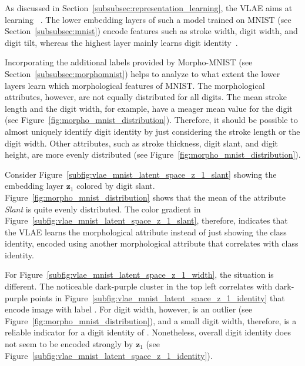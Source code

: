 As discussed in Section~\ref{subsubsec:representation_learning}, the \acl{VLAE} aims at learning ~\citep{zhao2017learning}.
The lower embedding layers of such a model trained on MNIST (see Section~\ref{subsubsec:mnist}) encode features such as stroke width, digit width, and digit tilt, whereas the highest layer mainly learns digit identity~\citep{zhao2017learning}.

Incorporating the additional labels provided by Morpho-\textsc{MNIST} (see Section~\ref{subsubsec:morphomnist}) helps to analyze to what extent the lower layers learn which morphological features of \textsc{MNIST}.
The morphological attributes, however, are not equally distributed for all digits.
The mean stroke length and the digit width, for example, have a meager mean value for the digit  (see Figure~\ref{fig:morpho_mnist_distribution}).
Therefore, it should be possible to almost uniquely identify digit  identity by just considering the stroke length or the digit width.
Other attributes, such as stroke thickness, digit slant, and digit height, are more evenly distributed (see Figure~\ref{fig:morpho_mnist_distribution}).

Consider Figure~\ref{subfig:vlae_mnist_latent_space_z_1_slant} showing the embedding layer $\bm{z}_1$ colored by digit slant.
Figure~\ref{fig:morpho_mnist_distribution} shows that the mean of the attribute \textit{Slant} is quite evenly distributed.
The color gradient in Figure~\ref{subfig:vlae_mnist_latent_space_z_1_slant}, therefore, indicates that the VLAE learns the morphological attribute instead of just showing the class identity, encoded using another morphological attribute that correlates with class identity.

For Figure~\ref{subfig:vlae_mnist_latent_space_z_1_width}, the situation is different.
The noticeable dark-purple cluster in the top left correlates with dark-purple points in Figure~\ref{subfig:vlae_mnist_latent_space_z_1_identity} that encode image with label .
For digit width, however,  is an outlier (see Figure~\ref{fig:morpho_mnist_distribution}), and a small digit width, therefore, is a reliable indicator for a digit identity of .
Nonetheless, overall digit identity does not seem to be encoded strongly by $\bm{z}_1$ (see Figure~\ref{subfig:vlae_mnist_latent_space_z_1_identity}).

